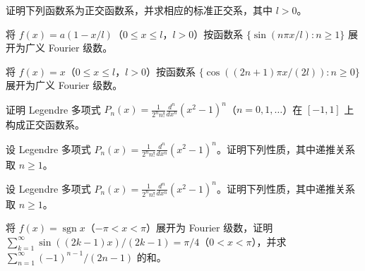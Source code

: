 \noindent\begin{minipage}{\textwidth}
证明下列函数系为正交函数系，并求相应的标准正交系，其中 $l>0$。
\end{minipage}\par\vfill
\newpage
\noindent\begin{minipage}{\textwidth}
将 $f(x)=a(1-x/l)$（$0\le x\le l$，$l>0$）按函数系 $\{\sin(n\pi x/l):n\ge1\}$ 展开为广义 Fourier 级数。
\end{minipage}\par\vfill
\noindent\begin{minipage}{\textwidth}
将 $f(x)=x$（$0\le x\le l$，$l>0$）按函数系 $\{\cos((2n+1)\pi x/(2l)):n\ge0\}$ 展开为广义 Fourier 级数。
\end{minipage}\par\vfill
\noindent\begin{minipage}{\textwidth}
证明 Legendre 多项式 $\displaystyle P_n(x)=\frac1{2^nn!}\frac{d^n}{dx^n}(x^2-1)^n$（$n=0,1,\ldots$）在 $[-1,1]$ 上构成正交函数系。
\end{minipage}\par\vfill
\noindent\begin{minipage}{\textwidth}
设 Legendre 多项式 $P_n(x)=\frac1{2^nn!}\frac{d^n}{dx^n}(x^2-1)^n$。证明下列性质，其中递推关系取 $n\ge1$。
\end{minipage}\par\vfill
\newpage
\noindent\begin{minipage}{\textwidth}
设 Legendre 多项式 $P_n(x)=\frac1{2^nn!}\frac{d^n}{dx^n}(x^2-1)^n$。证明下列性质，其中递推关系取 $n\ge1$。
\end{minipage}\par\vfill
\noindent\begin{minipage}{\textwidth}
将 $f(x)=\operatorname{sgn}x$（$-\pi<x<\pi$）展开为 Fourier 级数，证明 $\sum_{k=1}^{\infty}\sin((2k-1)x)/(2k-1)=\pi/4$（$0<x<\pi$），并求 $\sum_{n=1}^{\infty}(-1)^{n-1}/(2n-1)$ 的和。
\end{minipage}\par\vfill
